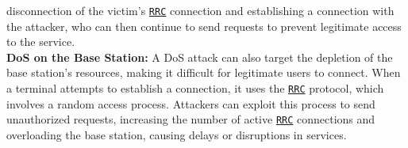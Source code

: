 \documentclass[english]{article}
\begin{document}
disconnection of the victim's \texttt{\hyperlink{RRC}{RRC}} connection and
establishing a connection with the attacker, who can then continue to send
requests to prevent legitimate access to the service.
\\[0.2cm]
\textbf{DoS on the Base Station:}
A DoS attack can also target the depletion of the base station's resources,
making it difficult for legitimate users to connect. When a terminal attempts
to establish a connection, it uses the \texttt{\hyperlink{RRC}{RRC}} protocol,
which involves a random access process. Attackers can exploit this process to
send unauthorized requests, increasing the number of active \texttt{\hyperlink{RRC}{RRC}}
connections and overloading the base station, causing delays or disruptions in services.
\\[0.2cm]
\end{document}
